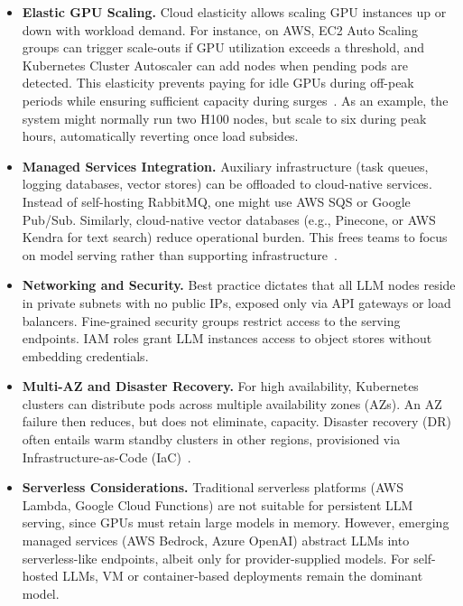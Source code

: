 \begin{itemize}
    \item \textbf{Elastic GPU Scaling.}  
    Cloud elasticity allows scaling GPU instances up or down with workload demand. 
    For instance, on AWS, EC2 Auto Scaling groups can trigger scale-outs if GPU utilization exceeds a threshold, and Kubernetes Cluster Autoscaler can add nodes when pending pods are detected. 
    This elasticity prevents paying for idle GPUs during off-peak periods while ensuring sufficient capacity during surges~\cite{terraform-docs}. 
    As an example, the \ishtar{} system might normally run two H100 nodes, but scale to six during peak hours, automatically reverting once load subsides.

    \item \textbf{Managed Services Integration.}  
    Auxiliary infrastructure (task queues, logging databases, vector stores) can be offloaded to cloud-native services. 
    Instead of self-hosting RabbitMQ, one might use AWS SQS or Google Pub/Sub. 
    Similarly, cloud-native vector databases (e.g., Pinecone, or AWS Kendra for text search) reduce operational burden. 
    This frees teams to focus on model serving rather than supporting infrastructure~\cite{pulumi-docs}.

    \item \textbf{Networking and Security.}  
    Best practice dictates that all LLM nodes reside in private subnets with no public IPs, exposed only via API gateways or load balancers. 
    Fine-grained security groups restrict access to the serving endpoints. 
    IAM roles grant LLM instances access to object stores without embedding credentials.

    \item \textbf{Multi-AZ and Disaster Recovery.}  
    For high availability, Kubernetes clusters can distribute pods across multiple availability zones (AZs). 
    An AZ failure then reduces, but does not eliminate, capacity. 
    Disaster recovery (DR) often entails warm standby clusters in other regions, provisioned via Infrastructure-as-Code (IaC)~\cite{opa-docs}. 

    \item \textbf{Serverless Considerations.}  
    Traditional serverless platforms (AWS Lambda, Google Cloud Functions) are not suitable for persistent LLM serving, since GPUs must retain large models in memory. 
    However, emerging managed services (AWS Bedrock, Azure OpenAI) abstract LLMs into serverless-like endpoints, albeit only for provider-supplied models. 
    For self-hosted LLMs, VM or container-based deployments remain the dominant model.
\end{itemize}

